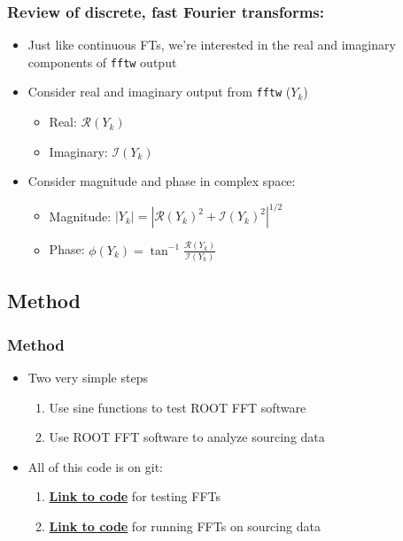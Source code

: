 \documentclass[bigger]{beamer}
\providecommand{\alert}[1]{\textbf{#1}}
\begin{document}
\begin{frame}
\frametitle{Review of discrete, fast Fourier transforms:}
\label{sec-1-1-4}
\begin{itemize}

\item Just like continuous FTs, we're interested in the real and imaginary components of \texttt{fftw} output
\label{sec-1-1-4-1}%

\item Consider real and imaginary output from \texttt{fftw} (\(Y_{k}\))
\label{sec-1-1-4-2}%
\begin{itemize}

\item Real: \(\mathcal{R}(Y_{k})\)
\label{sec-1-1-4-2-1}%

\item Imaginary: \(\mathcal{I}(Y_{k})\)
\label{sec-1-1-4-2-2}%
\end{itemize} %

\item Consider magnitude and phase in complex space:
\label{sec-1-1-4-3}%
\begin{itemize}

\item Magnitude: \(|Y_{k}| = |\mathcal{R}(Y_{k})^{2} + \mathcal{I}(Y_{k})^{2}|^{1/2}\)
\label{sec-1-1-4-3-1}%

\item Phase: \(\phi(Y_{k}) = \tan^{-1}\frac{\mathcal{R}(Y_{k})}{\mathcal{I}(Y_{k})}\)
\label{sec-1-1-4-3-2}%
\end{itemize} %
\end{itemize} %
\end{frame}
\subsection{Method}
\label{sec-1-2}
\begin{frame}
\frametitle{Method}
\label{sec-1-2-1}
\begin{itemize}

\item Two very simple steps
\label{sec-1-2-1-1}%
\begin{enumerate}
\item Use sine functions to test ROOT FFT software
\item Use ROOT FFT software to analyze sourcing data
\end{enumerate}

\item All of this code is on git:
\label{sec-1-2-1-2}%
\begin{enumerate}
\item \href{https://github.com/HCALPFG/HcalFFT/blob/master/FFT_tutorial.py}{\alert{Link to code}} for testing FFTs
\item \href{https://github.com/HCALPFG/HcalFFT/blob/master/FFT.py}{\alert{Link to code}} for running FFTs on sourcing data
\end{enumerate}
\end{itemize} %
\end{frame}
\end{document}

